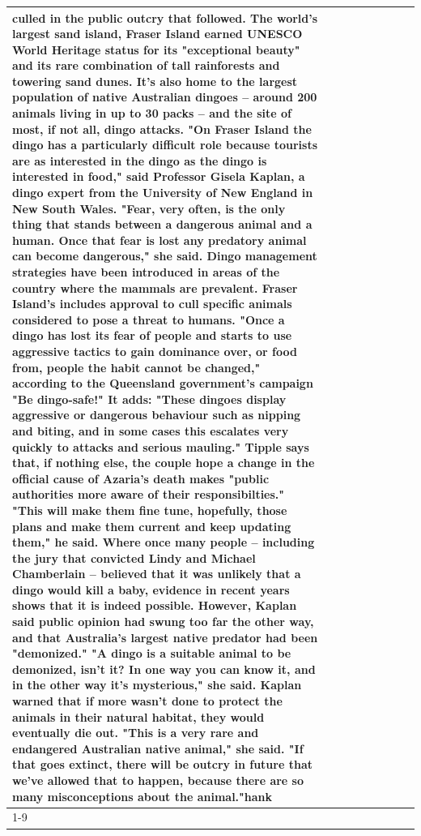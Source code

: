 \begin{table}[H]
\begin{tabular}{lllrlllll}
culled in the public outcry that followed. The world's largest sand island, Fraser Island earned UNESCO World Heritage status for its "exceptional beauty" and its rare combination of tall rainforests and towering sand dunes. It's also home to the largest population of native Australian dingoes -- around 200 animals living in up to 30 packs -- and the site of most, if not all, dingo attacks. "On Fraser Island the dingo has a particularly difficult role because tourists are as interested in the dingo as the dingo is interested in food," said Professor Gisela Kaplan, a dingo expert from the University of New England in New South Wales. "Fear, very often, is the only thing that stands between a dangerous animal and a human. Once that fear is lost any predatory animal can become dangerous," she said. Dingo management strategies have been introduced in areas of the country where the mammals are prevalent. Fraser Island's includes approval to cull specific animals considered to pose a threat to humans. "Once a dingo has lost its fear of people and starts to use aggressive tactics to gain dominance over, or food from, people the habit cannot be changed," according to the Queensland government's campaign "Be dingo-safe!" It adds: "These dingoes display aggressive or dangerous behaviour such as nipping and biting, and in some cases this escalates very quickly to attacks and serious mauling." Tipple says that, if nothing else, the couple hope a change in the official cause of Azaria's death makes "public authorities more aware of their responsibilties." "This will make them fine tune, hopefully, those plans and make them current and keep updating them," he said. Where once many people -- including the jury that convicted Lindy and Michael Chamberlain -- believed that it was unlikely that a dingo would kill a baby, evidence in recent years shows that it is indeed possible. However, Kaplan said public opinion had swung too far the other way, and that Australia's largest native predator had been "demonized." "A dingo is a suitable animal to be demonized, isn't it? In one way you can know it, and in the other way it's mysterious," she said. Kaplan warned that if more wasn't done to protect the animals in their natural habitat, they would eventually die out. "This is a very rare and endangered Australian native animal," she said. "If that goes extinct, there will be outcry in future that we've allowed that to happen, because there are so many misconceptions about the animal."hank \\
\cline{1-9}

\end{tabular}
\end{table}
